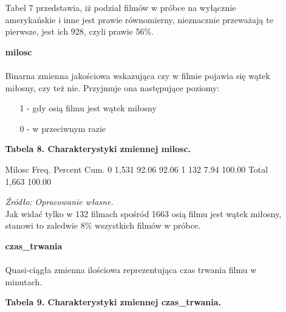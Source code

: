 \begin{itemize}
\begin{itemize}
	Tabel 7 przedstawia, iż podział filmów w próbce na wyłącznie amerykańskie i inne jest prawie równomierny, nieznacznie przeważają te pierwsze, jest ich 928, czyli prawie 56\%.
	
\vspace{0.3cm}	
	
	\item[\ding{228}]\textbf{milosc} \\
	\\Binarna zmienna jakościowa wskazująca czy w filmie pojawia się wątek miłosny, czy też nie. Przyjmuje ona następujące poziomy: 
	\begin{itemize}
	
	\item[1] - gdy osią filmu jest wątek miłosny
	\item[0] - w przeciwnym razie	
	
	\end{itemize}
	
	 \vspace{0.5cm}
	
{\centering
\textbf{Tabela 8. Charakterystyki zmiennej milosc.}}
\begin{stlog}	

	     Milosc {\VBAR}      Freq.     Percent        Cum.
          0 {\VBAR}      1,531       92.06       92.06
          1 {\VBAR}        132        7.94      100.00
      Total {\VBAR}      1,663      100.00
{\smallskip}

\end{stlog}

\textit{\footnotesize{Źródło: Opracowanie własne.}} \\

Jak widać tylko w 132 filmach spośród 1663 osią filmu jest wątek miłosny, stanowi to zaledwie 8\% wszystkich filmów w próbce.

\vspace{0.3cm}	
	
	\item[\ding{228}]\textbf{czas_trwania} \\
	\\Quasi-ciągła zmienna ilościowa reprezentująca czas trwania filmu w minutach. 
	
		 \vspace{1cm}
	
{\centering
\textbf{Tabela 9. Charakterystyki zmiennej czas_trwania.}}
\begin{stlog}	


\end{stlog}
\end{itemize}
\end{itemize}
